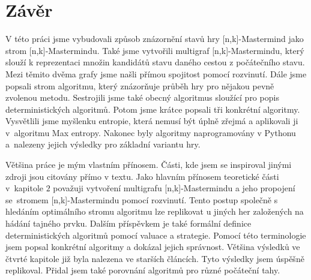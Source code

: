 \chapter*{Závěr}

V této práci jsme vybudovali způsob znázornění stavů hry [n,k]-Mastermind jako strom [n,k]-Mastermindu. Také jsme vytvořili multigraf [n,k]-Mastermindu, který slouží k reprezentaci množin kandidátů stavu daného cestou z počátečního stavu. Mezi těmito dvěma grafy jsme našli přímou spojitost pomocí rozvinutí. Dále jsme popsali strom algoritmu, který znázorňuje průběh hry pro nějakou pevně zvolenou metodu. Sestrojili jsme také obecný algoritmus sloužící pro popis deterministických algoritmů. Potom jsme krátce popsali tři konkrétní algoritmy. Vysvětlili jsme myšlenku entropie, která nemusí být úplně zřejmá a aplikovali ji v~algoritmu Max entropy. Nakonec byly algoritmy naprogramovány v Pythonu a~nalezeny jejich výsledky pro základní variantu hry. 

Většina práce je mým vlastním přínosem. Části, kde jsem se inspiroval jinými zdroji jsou citovány přímo v textu. Jako hlavním přínosem teoretické části v~kapitole $2$ považuji vytvoření multigrafu [n,k]-Mastermindu a jeho propojení se~stromem [n,k]-Mastermindu pomocí rozvinutí. Tento postup společně s hledáním optimálního stromu algoritmu lze replikovat u jiných her založených na hádání tajného prvku. Dalším příspěvkem je také formální definice deterministických algoritmů pomocí valuace a strategie. Pomocí této terminologie jsem popsal konkrétní algoritmy a dokázal jejich správnost. Většina výsledků ve čtvrté kapitole již byla nalezena ve starších článcích. Tyto výsledky jsem úspěšně replikoval. Přidal jsem také porovnání algoritmů pro různé počáteční tahy. 



